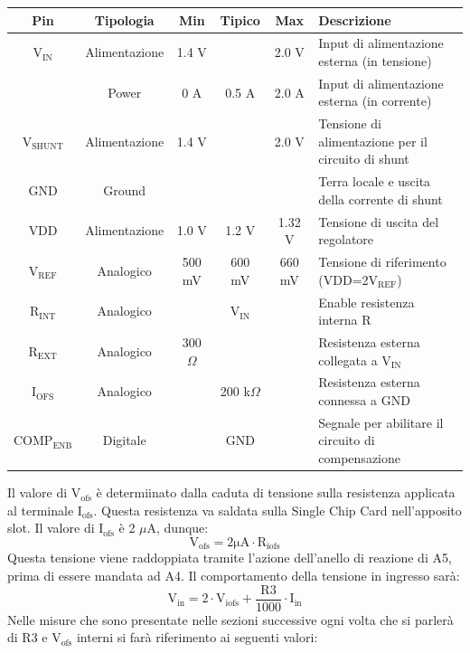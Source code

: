 \begin{small}
\noindent\setlength\tabcolsep{4pt}%
\begin{tabularx}{\linewidth}{|c|c|c|c|c|X|}
\hline
\textbf{Pin} & \textbf{Tipologia} & \textbf{Min} & \textbf{Tipico} & \textbf{Max} & \textbf{Descrizione} \\ \hline

$\mathrm{V_{IN}}$ & Alimentazione & 1.4 V & & 2.0 V & Input di alimentazione esterna (in tensione)\\ \hline
 & Power & 0 A & 0.5 A & 2.0 A & Input di alimentazione esterna (in corrente)\\ \hline     
$\mathrm{V_{SHUNT}}$ & Alimentazione & 1.4 V & & 2.0 V & Tensione di alimentazione per il circuito di shunt\\ \hline
GND & Ground &  & &  & Terra locale e uscita della corrente di shunt\\ \hline
VDD & Alimentazione & 1.0 V & 1.2 V & 1.32 V & Tensione di uscita del regolatore\\ \hline
$\mathrm{V_{REF}}$ & Analogico & 500 mV & 600 mV & 660 mV & Tensione di riferimento (VDD=2$\mathrm{V_{REF}}$)\\ \hline
$\mathrm{R_{INT}}$ & Analogico &  & $\mathrm{V_{IN}}$ &  & Enable resistenza interna R\\ \hline
$\mathrm{R_{EXT}}$ & Analogico & 300 $\Omega$ &  &  & Resistenza esterna collegata a $\mathrm{V_{IN}}$\\ \hline
$\mathrm{I_{OFS}}$ & Analogico &  & 200 k$\Omega$ &  & Resistenza esterna connessa a GND\\ \hline
$\mathrm{COMP_{ENB}}$ & Digitale &  & GND &  & Segnale per abilitare il circuito di compensazione\\ \hline
\end{tabularx}
\end{small}

Il valore di $\mathrm{V_{ofs}}$ è determiinato dalla caduta di tensione sulla resistenza applicata al terminale $\mathrm{I_{ofs}}$. 
Questa resistenza va saldata sulla Single Chip Card nell'apposito slot. Il valore di $\mathrm{I_{ofs}}$ è 2 $\mu$A, dunque:
\begin{equation}
\label{eq:Vofs}
\mathrm{V_{ofs} = 2 \mu A \cdot R_{iofs}}
\end{equation}
Questa tensione viene raddoppiata tramite l'azione dell'anello di reazione di A5, prima di essere mandata ad A4.
Il comportamento della tensione in ingresso sarà:
\begin{equation}
\mathrm{V_{in}= 2 \cdot V_{iofs} + \dfrac{R3}{1000} \cdot I_{in}}
\end{equation}
Nelle misure che sono presentate nelle sezioni successive ogni volta che si parlerà di R3 e $\mathrm{V_{ofs}}$ interni si farà riferimento ai seguenti valori:

